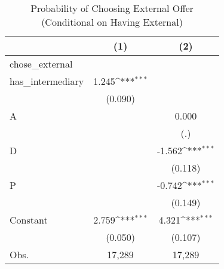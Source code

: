 \begin{table}[htbp]\centering
\def\sym#1{\ifmmode^{#1}\else\(^{#1}\)\fi}
\caption{Probability of Choosing External Offer (Conditional on Having External)}
\begin{tabular}{l*{2}{c}}
\hline\hline
                    &\multicolumn{1}{c}{(1)}         &\multicolumn{1}{c}{(2)}         \\
\hline
chose\_external      &                     &                     \\
has\_intermediary    &       1.245\sym{***}&                     \\
                    &     (0.090)         &                     \\
[1em]
A                   &                     &       0.000         \\
                    &                     &         (.)         \\
[1em]
D                   &                     &      -1.562\sym{***}\\
                    &                     &     (0.118)         \\
[1em]
P                   &                     &      -0.742\sym{***}\\
                    &                     &     (0.149)         \\
[1em]
Constant            &       2.759\sym{***}&       4.321\sym{***}\\
                    &     (0.050)         &     (0.107)         \\
\hline
Obs.                &      17,289         &      17,289         \\
\hline\hline
\end{tabular}
\end{table}
